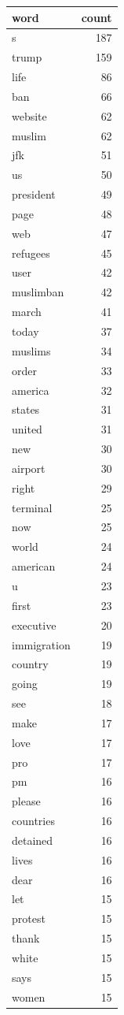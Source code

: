 \begin{tabular}{lr}
\toprule
word & count \\
\midrule
s & 187 \\
trump & 159 \\
life & 86 \\
ban & 66 \\
website & 62 \\
muslim & 62 \\
jfk & 51 \\
us & 50 \\
president & 49 \\
page & 48 \\
web & 47 \\
refugees & 45 \\
user & 42 \\
muslimban & 42 \\
march & 41 \\
today & 37 \\
muslims & 34 \\
order & 33 \\
america & 32 \\
states & 31 \\
united & 31 \\
new & 30 \\
airport & 30 \\
right & 29 \\
terminal & 25 \\
now & 25 \\
world & 24 \\
american & 24 \\
u & 23 \\
first & 23 \\
executive & 20 \\
immigration & 19 \\
country & 19 \\
going & 19 \\
see & 18 \\
make & 17 \\
love & 17 \\
pro & 17 \\
pm & 16 \\
please & 16 \\
countries & 16 \\
detained & 16 \\
lives & 16 \\
dear & 16 \\
let & 15 \\
protest & 15 \\
thank & 15 \\
white & 15 \\
says & 15 \\
women & 15 \\
\bottomrule
\end{tabular}
